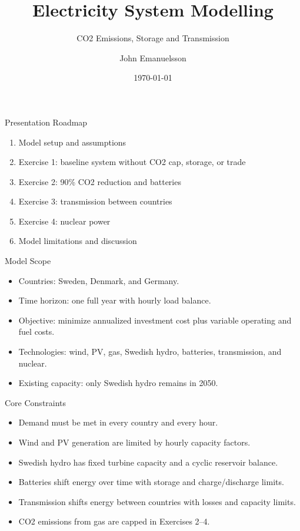 \documentclass[aspectratio=169]{beamer}
\title[Electricity System Modelling]{Electricity System Modelling}
\subtitle{CO2 Emissions, Storage and Transmission}
\author{John Emanuelsson}
\institute{Miljo och Matematisk Modellering}
\date{\today}
\begin{document}
\begin{frame}
  \titlepage
\end{frame}

\begin{frame}{Presentation Roadmap}
  \begin{enumerate}
    \item Model setup and assumptions
    \item Exercise 1: baseline system without CO2 cap, storage, or trade
    \item Exercise 2: 90\% CO2 reduction and batteries
    \item Exercise 3: transmission between countries
    \item Exercise 4: nuclear power
    \item Model limitations and discussion
  \end{enumerate}
\end{frame}

\begin{frame}{Model Scope}
  \begin{itemize}
    \item Countries: Sweden, Denmark, and Germany.
    \item Time horizon: one full year with hourly load balance.
    \item Objective: minimize annualized investment cost plus variable operating and fuel costs.
    \item Technologies: wind, PV, gas, Swedish hydro, batteries, transmission, and nuclear.
    \item Existing capacity: only Swedish hydro remains in 2050.
  \end{itemize}
\end{frame}

\begin{frame}{Core Constraints}
  \begin{itemize}
    \item Demand must be met in every country and every hour.
    \item Wind and PV generation are limited by hourly capacity factors.
    \item Swedish hydro has fixed turbine capacity and a cyclic reservoir balance.
    \item Batteries shift energy over time with storage and charge/discharge limits.
    \item Transmission shifts energy between countries with losses and capacity limits.
    \item CO2 emissions from gas are capped in Exercises 2--4.
  \end{itemize}
\end{frame}
\end{document}
